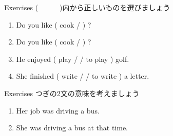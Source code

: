 \documentclass[aspectratio=169,xcolor={dvipsnames,table}]{beamer}
\begin{document}
\begin{frame}[plain]{Exercises}
(~~~~~~)内から正しいものを選びましょう
 \begin{enumerate}
  \item Do you like ( cook /  ) ?
  \item Do you like ( cook /  ) ?
  \item He enjoyed ( play /  / to play ) golf.
  \item She finished ( write /  / to write ) a letter.
 \end{enumerate}
\end{frame}
\begin{frame}[plain]{Exercises}
つぎの2文の意味を考えましょう\,\,\dbend\dbend

 \begin{enumerate}
  \item Her job was driving a bus.
  \item She was driving a bus at that time.
 \end{enumerate}
\end{frame}
\end{document}
